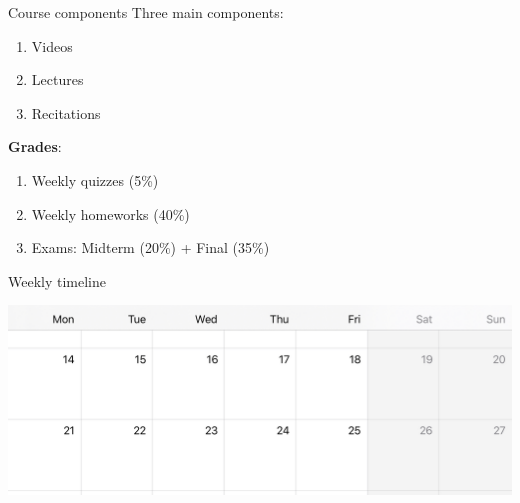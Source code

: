 \documentclass{beamer}
\begin{document}
\begin{frame}[t]{Course components}
	Three main components:
	\begin{enumerate}
		\item Videos 
		\item Lectures 
		\item Recitations 
	\end{enumerate}

	\vspace{0.5cm}
	\pause
	\textbf{Grades}:
	\begin{enumerate}
		\item Weekly quizzes (5\%)
		\item Weekly homeworks (40\%)
		\item Exams: Midterm (20\%) + Final (35\%)
	\end{enumerate}

\end{frame}
\begin{frame}{Weekly timeline}
	\begin{center}
		\includegraphics[width=\textwidth]{./timetable.jpg}
	\end{center}
\end{frame}
\end{document}
